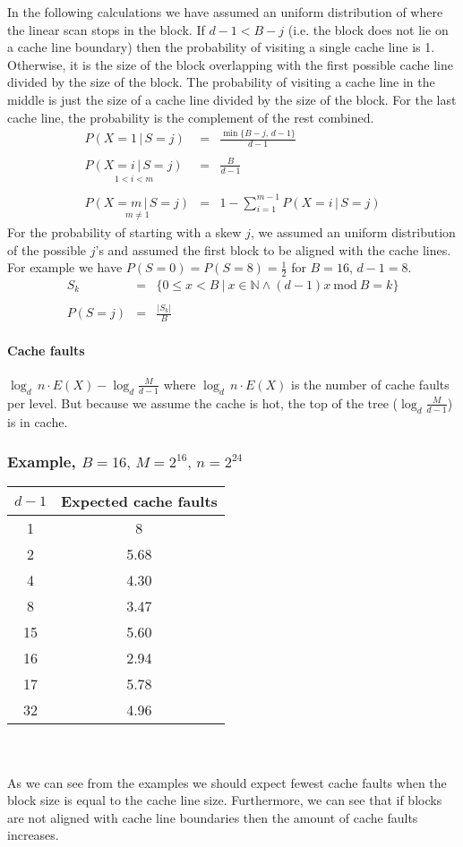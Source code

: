 In the following calculations we have assumed an uniform distribution of where the linear scan stops in the block. If $d - 1 < B - j$ (i.e. the block does not lie on a cache line boundary) then the probability of visiting a single cache line is 1. Otherwise, it is the size of the block overlapping with the first possible cache line divided by the size of the block. The probability of visiting a cache line in the middle is just the size of a cache line divided by the size of the block. For the last cache line, the probability is the complement of the rest combined.
\begin{eqnarray*}
P(X=1\,|\, S=j) & = & \frac{\min\{B-j,\, d-1\}}{d-1}\\
\\
\underset{1 < i < m}{P(X=i\,|\, S=j)} & = & \frac{B}{d-1}\\
\\
\underset{m\neq1}{P(X=m\,|\, S=j)} & = & 1-\sum_{i=1}^{m-1}P(X=i\,|\, S=j)
\end{eqnarray*}
For the probability of starting with a skew $j$, we assumed an uniform distribution of the possible $j$'s and assumed the first block to be aligned with the cache lines. For example we have $P(S = 0) = P(S = 8) = \frac{1}{2}$ for $B = 16$, $d - 1 = 8$.
\begin{eqnarray*}
S_k & = & \{ 0 \leq x < B\ |\ x \in \mathbb{N} \wedge (d - 1)x\ \textrm{mod}\ B = k \}\\
\\
P(S=j) & = & \frac{|S_k|}{B}
\end{eqnarray*}

\paragraph*{Cache faults}

$\log_{d}\, n\cdot E(X)-\log_{d}\frac{M}{d-1}$
where $\log_{d}\, n\cdot E(X)$ is the number of cache faults per level. But because we assume the cache is hot, the top of the tree ($\log_{d}\frac{M}{d-1}$) is in cache.

\subsubsection*{Example, $B=16,\, M=2^{16},\, n=2^{24}$}

\begin{tabular}{|c|c|}
\hline 
$d - 1$ & Expected cache faults\tabularnewline
\hline 
\hline 
1 & 8\tabularnewline
\hline 
2 & 5.68\tabularnewline
\hline 
4 & 4.30\tabularnewline
\hline 
8 & 3.47\tabularnewline
\hline 
15 & 5.60\tabularnewline
\hline 
16 & 2.94\tabularnewline
\hline 
17 & 5.78\tabularnewline
\hline 
32 & 4.96\tabularnewline
\hline 
\end{tabular}
\\
\\
As we can see from the examples we should expect fewest cache faults when the block size is equal to the cache line size. Furthermore, we can see that if blocks are not aligned with cache line boundaries then the amount of cache faults increases.

